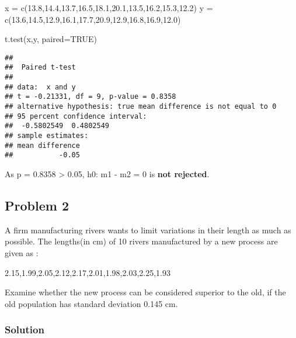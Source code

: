 \documentclass[
]{article}
\newenvironment{Shaded}{\begin{snugshade}}{\end{snugshade}}
\newcommand{\AttributeTok}[1]{\textcolor[rgb]{0.77,0.63,0.00}{#1}}
\newcommand{\ConstantTok}[1]{\textcolor[rgb]{0.00,0.00,0.00}{#1}}
\newcommand{\FloatTok}[1]{\textcolor[rgb]{0.00,0.00,0.81}{#1}}
\newcommand{\FunctionTok}[1]{\textcolor[rgb]{0.00,0.00,0.00}{#1}}
\newcommand{\NormalTok}[1]{#1}
\newcommand{\OtherTok}[1]{\textcolor[rgb]{0.56,0.35,0.01}{#1}}
\begin{document}
\begin{Shaded}
\begin{Highlighting}[]
\NormalTok{x }\OtherTok{=} \FunctionTok{c}\NormalTok{(}\FloatTok{13.8}\NormalTok{,}\FloatTok{14.4}\NormalTok{,}\FloatTok{13.7}\NormalTok{,}\FloatTok{16.5}\NormalTok{,}\FloatTok{18.1}\NormalTok{,}\FloatTok{20.1}\NormalTok{,}\FloatTok{13.5}\NormalTok{,}\FloatTok{16.2}\NormalTok{,}\FloatTok{15.3}\NormalTok{,}\FloatTok{12.2}\NormalTok{)}
\NormalTok{y }\OtherTok{=} \FunctionTok{c}\NormalTok{(}\FloatTok{13.6}\NormalTok{,}\FloatTok{14.5}\NormalTok{,}\FloatTok{12.9}\NormalTok{,}\FloatTok{16.1}\NormalTok{,}\FloatTok{17.7}\NormalTok{,}\FloatTok{20.9}\NormalTok{,}\FloatTok{12.9}\NormalTok{,}\FloatTok{16.8}\NormalTok{,}\FloatTok{16.9}\NormalTok{,}\FloatTok{12.0}\NormalTok{)}

\FunctionTok{t.test}\NormalTok{(x,y, }\AttributeTok{paired=}\ConstantTok{TRUE}\NormalTok{)}
\end{Highlighting}
\end{Shaded}

\begin{verbatim}
## 
##  Paired t-test
## 
## data:  x and y
## t = -0.21331, df = 9, p-value = 0.8358
## alternative hypothesis: true mean difference is not equal to 0
## 95 percent confidence interval:
##  -0.5802549  0.4802549
## sample estimates:
## mean difference 
##           -0.05
\end{verbatim}

As p = 0.8358 \textgreater{} 0.05, h0: m1 - m2 = 0 is \textbf{not
rejected}.

\hypertarget{problem-2-2}{%
\subsection{Problem 2}\label{problem-2-2}}

A firm manufacturing rivers wants to limit variations in their length as
much as possible. The lengths(in cm) of 10 rivers manufactured by a new
process are given as :

2.15,1.99,2.05,2.12,2.17,2.01,1.98,2.03,2.25,1.93

Examine whether the new process can be considered superior to the old,
if the old population has standard deviation 0.145 cm.

\hypertarget{solution-23}{%
\subsubsection{Solution}\label{solution-23}}
\end{document}

